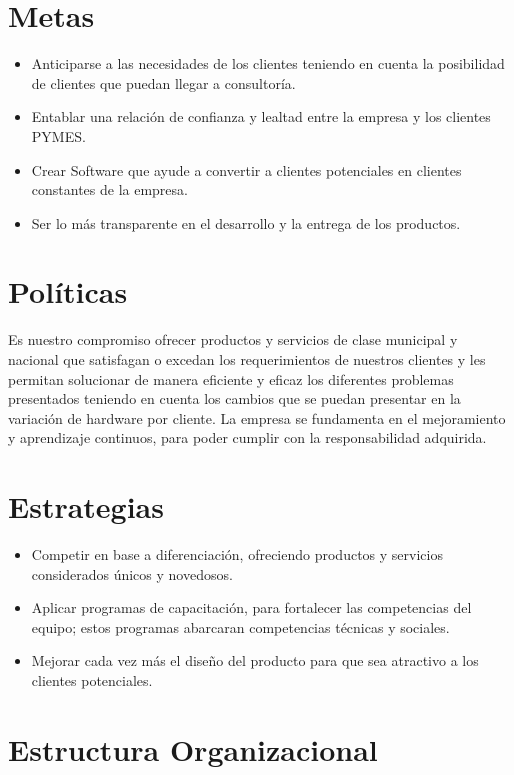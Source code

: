 \section{Metas}
\begin{itemize}
\item Anticiparse a las necesidades de los clientes teniendo en cuenta la posibilidad de 
clientes que puedan llegar a consultoría.
\item Entablar una relación de confianza y lealtad entre la empresa y los clientes PYMES.
\item Crear Software que ayude a convertir a clientes potenciales en clientes constantes 
de la empresa.
\item Ser lo más transparente en el desarrollo y la entrega de los productos.
\end{itemize}

\section{Pol\'iticas}
Es nuestro compromiso ofrecer productos y servicios de clase municipal y nacional que 
satisfagan o excedan los requerimientos de nuestros clientes y les permitan solucionar de 
manera eficiente y eficaz los diferentes problemas presentados teniendo en cuenta los 
cambios que se puedan presentar en la variación de hardware por cliente. La empresa se fundamenta en el mejoramiento y aprendizaje continuos, para poder cumplir con la responsabilidad adquirida.

\section{Estrategias}
\begin{itemize}
\item Competir en base a diferenciación, ofreciendo productos y servicios considerados 
únicos y novedosos.
\item Aplicar programas de capacitación, para fortalecer las competencias del equipo; 
estos programas abarcaran competencias técnicas y sociales.
\item Mejorar cada vez más el diseño del producto para que sea atractivo a los clientes 
potenciales.
\end{itemize}

\section{Estructura Organizacional}

